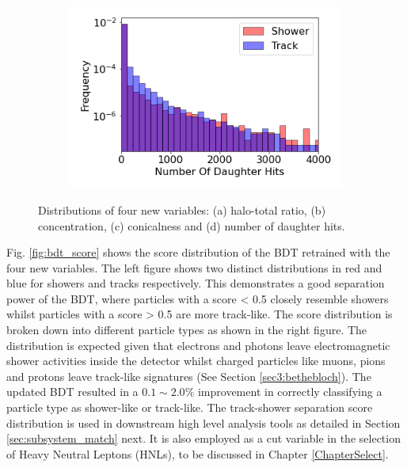 \begin{figure}[hb!]
\begin{subfigure}[b]{0.45\textwidth}
            \caption{}%
        \end{subfigure}
        \hfill
        \begin{subfigure}[b]{0.45\textwidth}  
            \centering 
            \includegraphics[width=\textwidth]{Feature_Number_Of_Daughter_Hits}
            \caption{}%
        \end{subfigure}
        \caption[New Variable Distributions of the Track-Shower Separation BDT]{
	Distributions of four new variables: (a) halo-total ratio, (b) concentration, (c) conicalness and (d) number of daughter hits.
	}
        \label{fig:bdt_features}
\end{figure}

Fig. \ref{fig:bdt_score} shows the score distribution of the BDT retrained with the four new variables.
The left figure shows two distinct distributions in red and blue for showers and tracks respectively.
This demonstrates a good separation power of the BDT, where particles with a score < 0.5 closely resemble showers whilst particles with a score > 0.5 are more track-like.
The score distribution is broken down into different particle types as shown in the right figure.
The distribution is expected given that electrons and photons leave electromagnetic shower activities inside the detector whilst charged particles like muons, pions and protons leave track-like signatures (See Section \ref{sec3:bethebloch}). 
The updated BDT resulted in a $0.1\sim2.0\%$ improvement in correctly classifying a particle type as shower-like or track-like.
The track-shower separation score distribution is used in downstream high level analysis tools as detailed in Section \ref{sec:subsystem_match} next.
It is also employed as a cut variable in the selection of Heavy Neutral Leptons (HNLs), to be discussed in Chapter \ref{ChapterSelect}.

